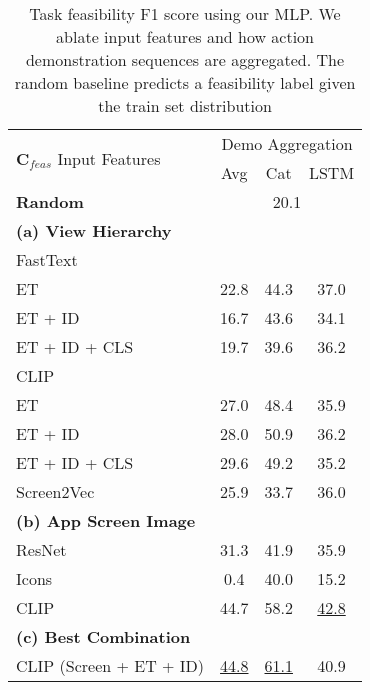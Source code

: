 \begin{table}[t]
    \centering
        \caption{Task feasibility F1 score using our MLP. We ablate input features and how action demonstration sequences are aggregated. The random baseline predicts a feasibility label given the train set distribution}
    \begin{tabular}{|l|c|c|c|}
    \hline
      \multirow{2}{*}{\textbf{C}$_{feas}$ Input Features} & \multicolumn{3}{c|}{Demo Aggregation}\\
      \cline{2-4}
      & Avg & Cat & LSTM \\ %
      \hline
      \textbf{Random} & \multicolumn{3}{c|}{20.1}\\
      \hline
     \textbf{(a) View Hierarchy} & & & \\ %
     FastText & & &  \\
    \hspace{4mm} ET & 22.8 & 44.3 & 37.0 \\
    \hspace{4mm} ET + ID & 16.7 & 43.6 & 34.1 \\ %
     
    \hspace{4mm} ET + ID + CLS & 19.7 & 39.6 & 36.2 \\
    CLIP & &  & \\
    \hspace{4mm} ET & 27.0 & 48.4 & 35.9 \\
     \hspace{4mm} ET + ID & 28.0 & 50.9 & 36.2 %
     \\
    \hspace{4mm} ET + ID + CLS & 29.6 & 49.2 & 35.2  \\
      Screen2Vec & 25.9 & 33.7 & 36.0 \\ %
      \hline
      \textbf{(b) App Screen Image} & & & \\ %
      ResNet & 31.3 & 41.9 & 35.9 \\ %
     Icons & 0.4 & 40.0 & 15.2 \\%
     CLIP & 44.7 & 58.2 & \underline{42.8} \\%
      \hline
      \textbf{(c) Best Combination} & & & \\%
      CLIP (Screen + ET + ID) & \underline{44.8} & \underline{61.1} & 40.9 \\ 
      \hline
    \end{tabular}

    \label{tab:full_feas}
\end{table} 

